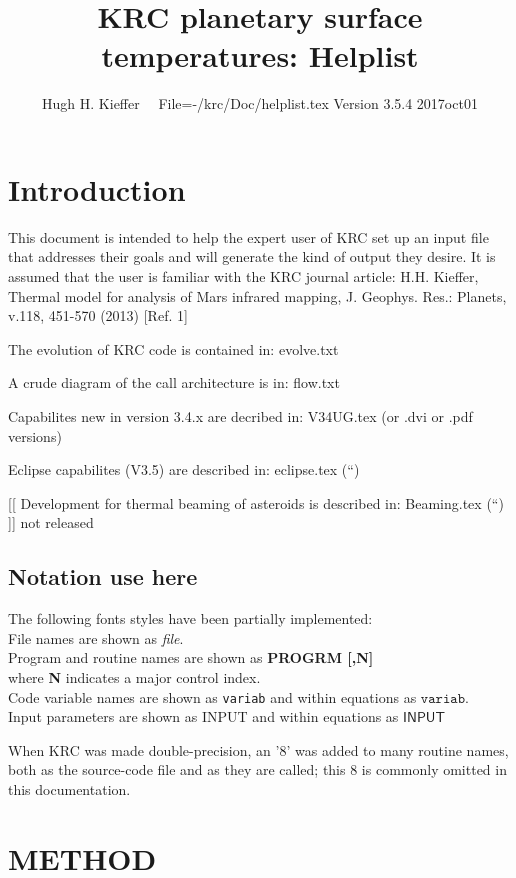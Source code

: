 \documentclass{article}
\title{KRC planetary surface temperatures: Helplist}
\author{Hugh H. Kieffer  \ \ File=-/krc/Doc/helplist.tex Version 3.5.4 2017oct01}
\newcommand{\qi}{\\ \hspace*{2.em}}      %
\newcommand{\qii}{\\ \hspace*{4.em}}     %
\newcommand{\np}{\textbf}  %
\newcommand{\nf}{\textit}  %
\newcommand{\nv}{\texttt}  %
\newcommand{\nvf}{\mathtt} %
\newcommand{\nj}{\textsf}  %
\newcommand{\njf}{\mathsf} %
\begin{document}
\maketitle

\tableofcontents


\section{Introduction} %

This document is intended to help the expert user of KRC set up an input file
that addresses their goals and will generate the kind of output they desire. It
is assumed that the user is familiar with the KRC journal article: H.H. Kieffer,
Thermal model for analysis of Mars infrared mapping, J. Geophys. Res.: Planets,
v.118, 451-570 (2013) [Ref. 1]

The evolution of KRC code is contained in:  evolve.txt 

A crude diagram of the call architecture is in:  flow.txt

Capabilites new in version 3.4.x are decribed in: V34UG.tex (or .dvi or .pdf versions)

Eclipse capabilites (V3.5) are described in: eclipse.tex  (``)

[[ Development for thermal beaming of asteroids is described in: Beaming.tex (``) ]] not released

\subsection{Notation use here}
The following fonts styles have been partially implemented: 
\qi File names are shown as \nf{file}. 
\qi Program and routine names are shown as \np{PROGRM [,N]} 
\qii where \np{N} indicates a major control index. 
\qi Code variable names are shown as \nv{variab} and within equations as $\nvf{variab}$.  
\qi Input parameters are shown as \nj{INPUT} and within equations as $\njf{INPUT}$

When KRC was made double-precision, an '8' was added to many routine names, both
as the source-code file and as they are called; this 8 is commonly omitted in
this documentation.

\section{METHOD}
\end{document}
